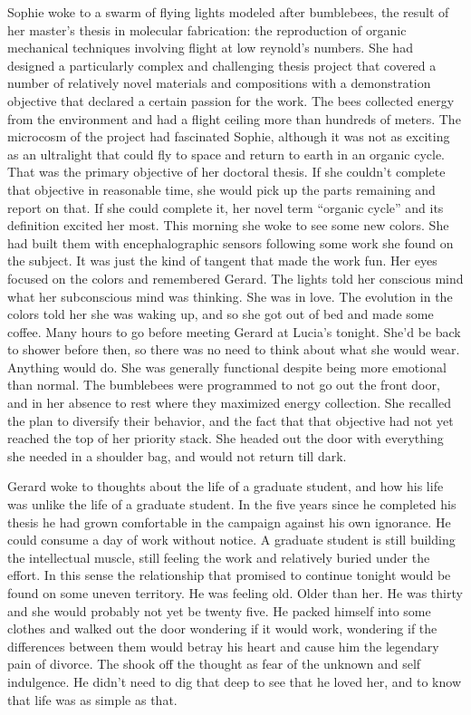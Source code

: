 Sophie woke to a swarm of flying lights modeled after bumblebees, the
result of her master's thesis in molecular fabrication: the
reproduction of organic mechanical techniques involving flight at low
reynold's numbers.  She had designed a particularly complex and
challenging thesis project that covered a number of relatively novel
materials and compositions with a demonstration objective that
declared a certain passion for the work.  The bees collected energy
from the environment and had a flight ceiling more than hundreds of
meters.  The microcosm of the project had fascinated Sophie, although
it was not as exciting as an ultralight that could fly to space and
return to earth in an organic cycle.  That was the primary objective
of her doctoral thesis.  If she couldn't complete that objective in
reasonable time, she would pick up the parts remaining and report on
that.  If she could complete it, her novel term ``organic cycle'' and
its definition excited her most.  This morning she woke to see some
new colors.  She had built them with encephalographic sensors
following some work she found on the subject.  It was just the kind of
tangent that made the work fun.  Her eyes focused on the colors and
remembered Gerard.  The lights told her conscious mind what her
subconscious mind was thinking.  She was in love.  The evolution in
the colors told her she was waking up, and so she got out of bed and
made some coffee.  Many hours to go before meeting Gerard at Lucia's
tonight.  She'd be back to shower before then, so there was no need to
think about what she would wear.  Anything would do.  She was
generally functional despite being more emotional than normal.  The
bumblebees were programmed to not go out the front door, and in her
absence to rest where they maximized energy collection.  She recalled
the plan to diversify their behavior, and the fact that that objective
had not yet reached the top of her priority stack.  She headed out the
door with everything she needed in a shoulder bag, and would not
return till dark.



Gerard woke to thoughts about the life of a graduate student, and how
his life was unlike the life of a graduate student.  In the five years
since he completed his thesis he had grown comfortable in the campaign
against his own ignorance.  He could consume a day of work without
notice.  A graduate student is still building the intellectual muscle,
still feeling the work and relatively buried under the effort.  In
this sense the relationship that promised to continue tonight would be
found on some uneven territory.  He was feeling old.  Older than her.
He was thirty and she would probably not yet be twenty five.  He
packed himself into some clothes and walked out the door wondering if
it would work, wondering if the differences between them would betray
his heart and cause him the legendary pain of divorce.  The shook off
the thought as fear of the unknown and self indulgence.  He didn't
need to dig that deep to see that he loved her, and to know that life
was as simple as that.



